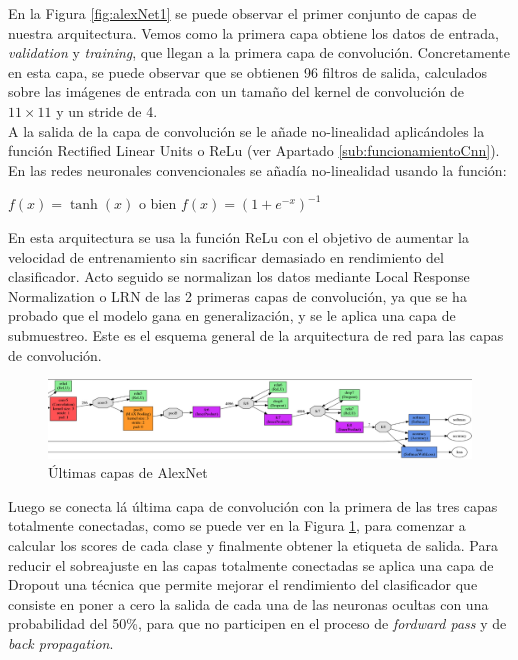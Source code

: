 \documentclass[a4paper,11pt]{book}
\begin{document}
En la Figura \ref{fig:alexNet1} se puede observar el primer conjunto de capas de nuestra arquitectura. Vemos como la primera capa obtiene los datos de entrada, \textit{validation} y \textit{training}, que llegan a la primera capa de convolución. Concretamente en esta capa, se puede observar que se obtienen 96 filtros de salida, calculados sobre las imágenes de entrada con un tamaño del kernel de convolución de \(11\times11\) y un stride de 4.\\
A la salida de la capa de convolución se le añade no-linealidad aplicándoles la función Rectified Linear Units o ReLu (ver Apartado \ref{sub:funcionamientoCnn}). En las redes neuronales convencionales se añadía no-linealidad usando la función:
\begin{center}
	\(f(x) = \tanh(x)\) o bien \(f(x) = (1+e^{-x})^{-1}\)
\end{center}
En esta arquitectura se usa la función ReLu con el objetivo de aumentar la velocidad de entrenamiento sin sacrificar demasiado en rendimiento del clasificador. Acto seguido se normalizan los datos mediante Local Response Normalization o LRN de las 2 primeras capas de convolución, ya que se ha probado que el modelo gana en generalización\cite{krizhevsky12}, y se le aplica una capa de submuestreo. Este es el esquema general de la arquitectura de red para las capas de convolución.\\

\begin{figure}[h]
	\centering
	\includegraphics[width=1\linewidth]{imagenes/alexNet2}
	\caption[AlexNet input]{Últimas capas de AlexNet}
	\label{fig:alexNet2}
\end{figure}

Luego se conecta lá última capa de convolución con la primera de las tres capas totalmente conectadas, como se puede ver en la Figura \ref{fig:alexNet2}, para comenzar a calcular los scores de cada clase y finalmente obtener la etiqueta de salida. Para reducir el sobreajuste en las capas totalmente conectadas se aplica una capa de Dropout una técnica que permite mejorar el rendimiento del clasificador que consiste en poner a cero la salida de cada una de las neuronas ocultas con una probabilidad del 50\%, para que no participen en el proceso de \textit{fordward pass} y de \textit{back propagation}\cite{krizhevsky12}.
\end{document}
